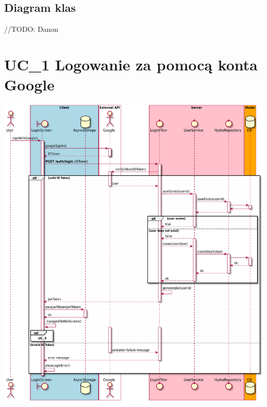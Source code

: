 \documentclass[oneside]{scrreprt}
\begin{document}
\subsection{Diagram klas}
//TODO: Danon

\section{UC\_1 Logowanie za pomocą konta Google}
\includegraphics[width=\textwidth, keepaspectratio]{graphics/sequence_diagram_login.pdf}
\end{document}
